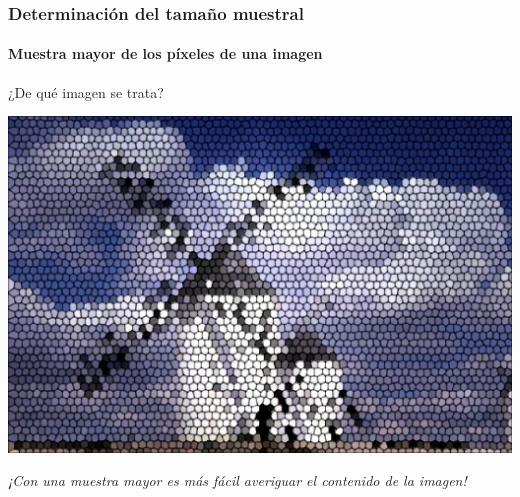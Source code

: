 \begin{frame}
\frametitle{Determinación del tamaño muestral}
\framesubtitle{Muestra mayor de los píxeles de una imagen}
\begin{center}
¿De qué imagen se trata?

\includegraphics[scale=0.45]{img/introduccion/muestra_molinos2}

\emph{¡Con una muestra mayor es más fácil averiguar el contenido de la imagen!}
\end{center}
\end{frame}


